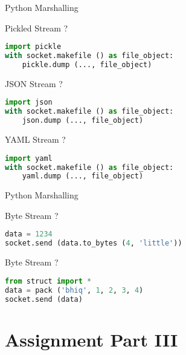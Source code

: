 \begin{frame}[fragile]{Python Marshalling}
    \begin{block}{Pickled Stream ?}
\begin{lstlisting}[language=python,style=mini]
import pickle
with socket.makefile () as file_object:
    pickle.dump (..., file_object)
\end{lstlisting}
    \end{block}
    \begin{block}{JSON Stream ?}
\begin{lstlisting}[language=python,style=mini]
import json
with socket.makefile () as file_object:
    json.dump (..., file_object)
\end{lstlisting}
    \end{block}
    \begin{block}{YAML Stream ?}
\begin{lstlisting}[language=python,style=mini]
import yaml
with socket.makefile () as file_object:
    yaml.dump (..., file_object)
\end{lstlisting}
    \end{block}
\end{frame}


\begin{frame}[fragile]{Python Marshalling}
    \begin{block}{Byte Stream ?}
\begin{lstlisting}[language=python,style=mini]
data = 1234
socket.send (data.to_bytes (4, 'little'))
\end{lstlisting}
    \end{block}
    \begin{block}{Byte Stream ?}
\begin{lstlisting}[language=python,style=mini]
from struct import *
data = pack ('bhiq', 1, 2, 3, 4)
socket.send (data)
\end{lstlisting}
    \end{block}
\end{frame}


\section{Assignment Part III}


